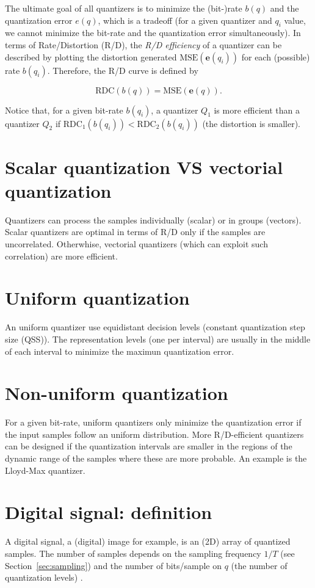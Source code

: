 The ultimate goal of all quantizers is to minimize the (bit-)rate
$b(q)$ and the quantization error $e(q)$, which is a tradeoff (for a
given quantizer and $q_i$ value, we cannot minimize the bit-rate and
the quantization error simultaneously). In terms of Rate/Distortion
(R/D), the \emph{R/D efficiency} of a quantizer can be described by
plotting the distortion generated $\text{MSE}(\mathbf{e}(q_i))$ for
each (possible) rate $b(q_i)$. Therefore, the R/D curve is defined by

\begin{equation}
  \text{RDC}(b(q)) = \text{MSE}(\mathbf{e}(q)).
\end{equation}

Notice that, for a given bit-rate $b(q_i)$, a quantizer $Q_1$ is more
efficient than a quantizer $Q_2$ if
$\text{RDC}_1(b(q_i))<\text{RDC}_2(b(q_i))$ (the distortion is
smaller).

\section{Scalar quantization VS vectorial quantization}

Quantizers can process the samples individually (scalar) or in groups
(vectors). Scalar quantizers are optimal in terms of R/D only if the
samples are uncorrelated. Otherwhise, vectorial quantizers (which can
exploit such correlation) are more efficient.

\section{Uniform quantization}

An uniform quantizer use equidistant decision levels (constant
quantization step size (QSS)). The representation levels (one per
interval) are usually in the middle of each interval to minimize the
maximun quantization error.

\section{Non-uniform quantization}

For a given bit-rate, uniform quantizers only minimize the
quantization error if the input samples follow an uniform
distribution. More R/D-efficient quantizers can be designed if the
quantization intervals are smaller in the regions of the dynamic range
of the samples where these are more probable. An example is the
Lloyd-Max quantizer.


\section{Digital signal: definition}

A digital signal, a (digital) image for example, is an (2D) array of
quantized samples. The number of samples depends on the sampling
frequency $1/T$ (see Section~\ref{sec:sampling}) and the number of
bits/sample on $q$ (the number of quantization levels)
.
